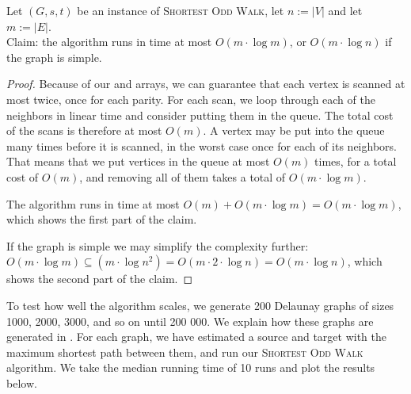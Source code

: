 






\begin{theorem}
    Let $(G,s,t)$ be an instance of \textsc{Shortest Odd Walk}, let $n := |V|$ and let $m := |E|$.\\
    Claim: the algorithm runs in time at most $O(m \cdot \log m)$, or $O(m \cdot \log n)$ if the graph is simple.
    \begin{proof}
        Because of our  and  arrays, we can guarantee that each vertex is scanned at most twice, once for each parity. For each scan, we loop through each of the neighbors in linear time and consider putting them in the queue. The total cost of the scans is therefore at most $O(m)$. A vertex may be put into the queue many times before it is scanned, in the worst case once for each of its neighbors. That means that we put vertices in the queue at most $O(m)$ times, for a total cost of $O(m)$, and removing all of them takes a total of $O(m \cdot \log m)$. 
        
        The algorithm runs in time at most $O(m) + O(m \cdot \log m) = O(m \cdot \log m)$, which shows the first part of the claim.
        
        If the graph is simple we may simplify the complexity further: $O(m \cdot \log m) \subseteq (m \cdot \log n^2) = O(m \cdot 2 \cdot \log n) = O(m \cdot \log n)$, which shows the second part of the claim.
    \end{proof}
\end{theorem}

To test how well the algorithm scales, we generate 200 Delaunay graphs of sizes 1000, 2000, 3000, and so on until 200 000. We explain how these graphs are generated in . For each graph, we have estimated a source and target with the maximum shortest path between them, and run our \textsc{Shortest Odd Walk} algorithm. We take the median running time of 10 runs and plot the results below.

